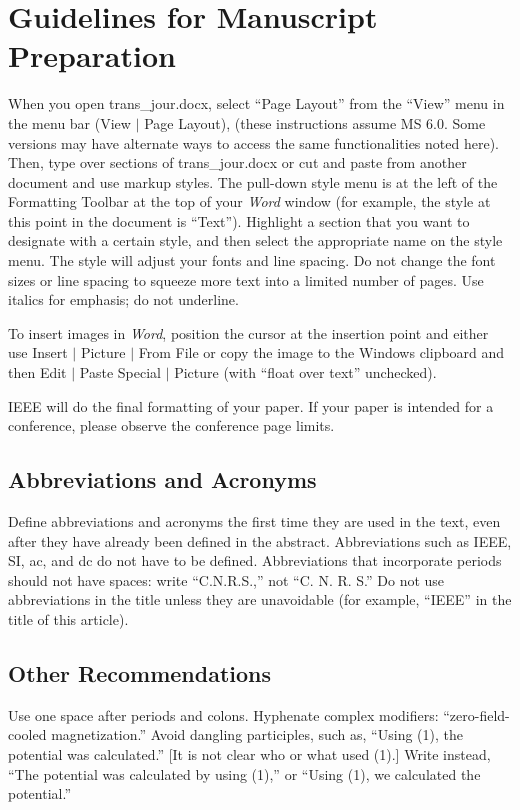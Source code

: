\documentclass[journal]{IEEEtai}
\begin{document}
\section{Guidelines for Manuscript Preparation}

When you open trans\_jour.docx, select ``Page Layout'' from the ``View'' menu in the menu bar (View $|$ Page Layout), (these instructions assume MS 6.0. Some versions may have alternate ways to access the same functionalities noted here). Then, type over sections of trans\_jour.docx or cut and paste from another document and use markup styles. The pull-down style menu is at the left of the Formatting Toolbar at the top of your {\it Word} window (for example, the style at this point in the document is ``Text''). Highlight a section that you want to designate with a certain style, and then select the appropriate name on the style menu. The style will adjust your fonts and line spacing. Do not change the font sizes or line spacing to squeeze more text into a limited number of pages. Use italics for emphasis; do not underline.

To insert images in {\it Word}, position the cursor at the insertion point and either use Insert $|$ Picture $|$ From File or copy the image to the Windows clipboard and then Edit $|$ Paste Special $|$ Picture (with ``float over text'' unchecked). 

IEEE will do the final formatting of your paper. If your paper is intended for a conference, please observe the conference page limits.

\subsection{Abbreviations and Acronyms}

Define abbreviations and acronyms the first time they are used in the text, even after they have already been defined in the abstract. Abbreviations such as IEEE, SI, ac, and dc do not have to be defined. Abbreviations that incorporate periods should not have spaces: write ``C.N.R.S.,'' not ``C. N. R. S.'' Do not use abbreviations in the title unless they are unavoidable (for example, ``IEEE'' in the title of this article).

\subsection{Other Recommendations}

Use one space after periods and colons. Hyphenate complex modifiers: ``zero-field-cooled magnetization.'' Avoid dangling participles, such as, ``Using (1), the potential was calculated.'' [It is not clear who or what used (1).] Write instead, ``The potential was calculated by using (1),'' or ``Using (1), we calculated the potential.''
\end{document}
